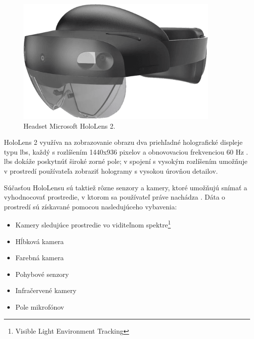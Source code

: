 \begin{figure}[!htbp]
  \centering
  \includegraphics[width=10cm]{img/microsofthololens2.png}
  \caption{Headset Microsoft HoloLens 2.}
  \label{hololens}
\end{figure}	

HoloLens 2 využíva na zobrazovanie obrazu dva priehľadné holografické displeje typu \acrshort{lbs}, každý s rozlíšením 1440x936 pixelov a obnovovaciou frekvenciou
 60 Hz \cite{MicrosoftHoloLensFull}. 
\acrshort{lbs} dokáže poskytnúť široké zorné pole; v spojení s vysokým rozlíšením umožňuje v prostredí používateľa zobraziť hologramy s vysokou úrovňou detailov.

Súčasťou HoloLensu sú taktiež rôzne senzory a kamery, ktoré umožňujú snímať a vyhodnocovať prostredie, v ktorom sa používateľ práve nachádza \cite{AdvancingMRExperience}. 
Dáta o prostredí sú získavané pomocou nasledujúceho vybavenia:
\begin{itemize}
  \item Kamery sledujúce prostredie vo viditeľnom spektre\footnote{Visible Light Environment Tracking}
  \item Hĺbková kamera
  \item Farebná kamera
  \item Pohybové senzory
  \item Infračervené kamery
  \item Pole mikrofónov  
\end{itemize}

